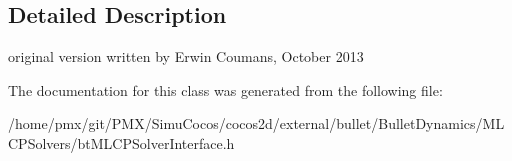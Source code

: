 \subsection{Detailed Description}
original version written by Erwin Coumans, October 2013 

The documentation for this class was generated from the following file\+:\begin{DoxyCompactItemize}
\item 
/home/pmx/git/\+P\+M\+X/\+Simu\+Cocos/cocos2d/external/bullet/\+Bullet\+Dynamics/\+M\+L\+C\+P\+Solvers/bt\+M\+L\+C\+P\+Solver\+Interface.\+h\end{DoxyCompactItemize}
